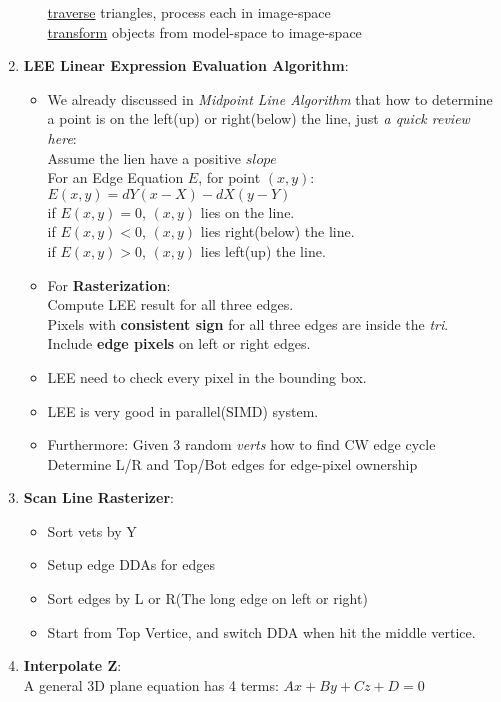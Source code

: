 \documentclass[geye,cyan,normal,en]{elegantnote}
\begin{document}
\begin{enumerate}
\begin{itemize}
		\underline{traverse} triangles, process each in image-space\\
		\underline{transform} objects from model-space to image-space
	\end{itemize}
	\item \textbf{LEE Linear Expression Evaluation Algorithm}:
	\begin{itemize}
		\item We already discussed in \textit{Midpoint Line Algorithm} that how to determine a point is on the left(up) or right(below) the line, just \textit{a quick review here}:\\
		Assume the lien have a positive $slope$\\
		For an Edge Equation $E$, for point $(x,y)$: $E(x,y)=dY(x-X)-dX(y-Y)$\\
		if $E(x,y)=0$, $(x,y)$ lies on the line.\\
		if $E(x,y)<0$, $(x,y)$ lies right(below) the line.\\
		if $E(x,y)>0$, $(x,y)$ lies left(up) the line.
		\item For \textbf{Rasterization}:\\
		Compute LEE result for all three edges.\\
		Pixels with \textbf{consistent sign} for all three edges are inside the \textit{tri}.\\
		Include \textbf{edge pixels} on left or right edges.
		\item LEE need to check every pixel in the bounding box.
		\item LEE is very good in parallel(SIMD) system.
		\item Furthermore: Given 3 random \textit{verts} how to find CW edge cycle\\
		Determine L/R and Top/Bot edges for edge-pixel ownership
	\end{itemize}
	\item \textbf{Scan Line Rasterizer}:
	\begin{itemize}
		\item Sort vets by Y
		\item Setup edge DDAs for edges
		\item Sort edges by L or R(The long edge on left or right)
		\item Start from Top Vertice, and switch DDA when hit the middle vertice.		
	\end{itemize}
	\item \textbf{Interpolate Z}:\\
	A general 3D plane equation has 4 terms: $Ax+By+Cz+D=0$\\

\end{enumerate}
\end{document}
